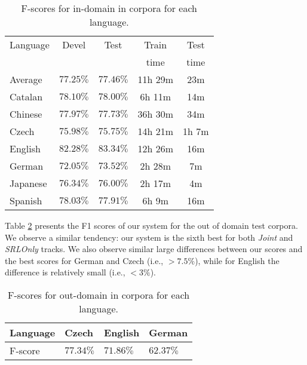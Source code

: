 \begin{table}

\begin{center}
\small
\begin{tabular}{|l|c|c|c|c|}\hline
Language           & Devel        & Test       & Train & Test  \\ 
                   &          &         & time  & time \\\hline
Average         & $77.25\%$    & $77.46\%$  & 11h 29m & 23m   \\\hline
Catalan         & $78.10\%$    & $78.00\%$  & 6h 11m  & 14m   \\ %
Chinese         & $77.97\%$    & $77.73\%$  & 36h 30m & 34m   \\ %
Czech           & $75.98\%$    & $75.75\%$  & 14h 21m & 1h 7m \\ %
English         & $82.28\%$    & $83.34\%$  & 12h 26m & 16m   \\ %
German          & $72.05\%$    & $73.52\%$  & 2h 28m  & 7m    \\ %
Japanese        & $76.34\%$    & $76.00\%$  & 2h 17m  & 4m    \\ %
Spanish         & $78.03\%$    & $77.91\%$  & 6h 9m   & 16m   \\ %
\hline
\end{tabular}
\caption{F-scores for in-domain in corpora for each language.}
\label{tbl:results}
\normalsize
\end{center}
\end{table}

Table \ref{tbl:outresults} presents the F1 scores of our system for the out of 
domain test corpora. We observe a similar tendency: our system is the sixth best 
for both \emph{Joint} and \emph{SRLOnly} tracks. We also observe similar 
large differences between our scores and the best scores for German and Czech 
(i.e., $>7.5\%$), while for English the difference is relatively small (i.e., $<3\%$). 

\begin{table}
\begin{center}
\small
\begin{tabular}{|l|l|l|l|}\hline
Language        & Czech & English & German\\\hline\hline
F-score           & $77.34\%$ & $71.86\%$ & $62.37\%$  \\
\hline
\end{tabular}
\caption{F-scores for out-domain in corpora for each language.}
\label{tbl:outresults}
\normalsize
\end{center}
\end{table}

